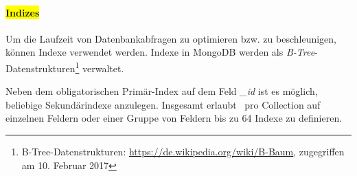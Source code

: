 \paragraph{\colorbox{yellow}{Indizes}}
Um die Laufzeit von Datenbankabfragen zu optimieren bzw. zu beschleunigen, können Indexe verwendet werden. Indexe in MongoDB werden als \textit{B-Tree}-Datenstrukturen\footnote{B-Tree-Datenstrukturen: \url{https://de.wikipedia.org/wiki/B-Baum}, zugegriffen am 10. Februar 2017} verwaltet.

Neben dem obligatorischen Primär-Index auf dem Feld \textit{\_id} ist es möglich, beliebige Sekundärindexe anzulegen. Insgesamt erlaubt \mongo\, pro Collection auf einzelnen Feldern oder einer Gruppe von Feldern bis zu 64 Indexe zu definieren.

